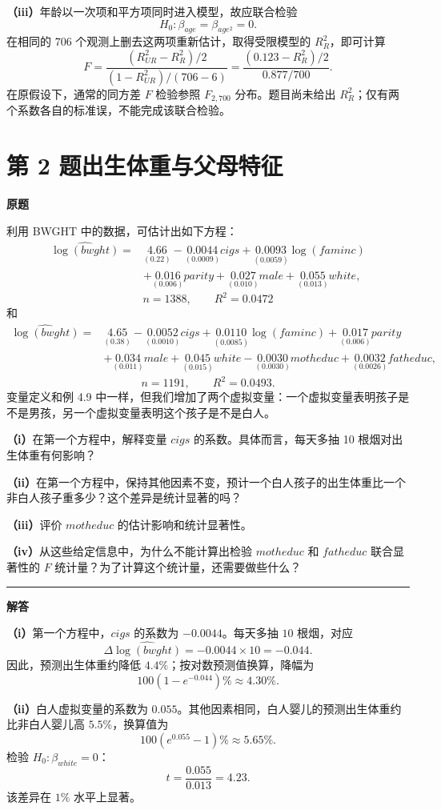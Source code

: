 \documentclass[UTF8,a4paper,11pt,fontset=fandol]{ctexart}
\newcommand{\vr}[1]{\mathit{#1}}
\newcommand{\subq}[1]{\par\medskip\noindent\textbf{（#1）}\enspace}
\newcommand{\question}[2]{\def\currentquestiontitle{第 #1 题\quad #2}}
\newcommand{\coef}[2]{\underset{\scriptstyle(#2)}{#1}}
\newenvironment{originalquestion}{%
  \par\medskip\noindent\begin{minipage}{\linewidth}
  \section*{\currentquestiontitle}
  \par\smallskip\noindent\textbf{原题}\par\smallskip
  \begingroup\small\setlength{\parskip}{2.5pt}%
}{%
  \par\endgroup\end{minipage}\par\medskip\Needspace{6\baselineskip}
  \noindent\rule{\linewidth}{0.35pt}\par\smallskip
  \noindent\textbf{解答}\par
}
\begin{document}
\subq{iii}年龄以一次项和平方项同时进入模型，故应联合检验
\[
H_0:\beta_{\vr{age}}=\beta_{\vr{age}^2}=0.
\]
在相同的 $706$ 个观测上删去这两项重新估计，取得受限模型的 $R_R^2$，即可计算
\[
F=\frac{(R_{UR}^2-R_R^2)/2}{(1-R_{UR}^2)/(706-6)}
 =\frac{(0.123-R_R^2)/2}{0.877/700}.
\]
在原假设下，通常的同方差 $F$ 检验参照 $F_{2,700}$ 分布。题目尚未给出 $R_R^2$；仅有两个系数各自的标准误，不能完成该联合检验。

\question{2}{出生体重与父母特征}
\begin{originalquestion}
利用 BWGHT 中的数据，可估计出如下方程：
\[
\begin{aligned}
\widehat{\log(\vr{bwght})}={}&\coef{4.66}{0.22}
-\coef{0.0044}{0.0009}\vr{cigs}
+\coef{0.0093}{0.0059}\log(\vr{faminc})\\
&+\coef{0.016}{0.006}\vr{parity}
+\coef{0.027}{0.010}\vr{male}
+\coef{0.055}{0.013}\vr{white},
\end{aligned}
\]
\[
n=1388,\qquad R^2=0.0472
\]
和
\[
\begin{aligned}
\widehat{\log(\vr{bwght})}={}&\coef{4.65}{0.38}
-\coef{0.0052}{0.0010}\vr{cigs}
+\coef{0.0110}{0.0085}\log(\vr{faminc})
+\coef{0.017}{0.006}\vr{parity}\\
&+\coef{0.034}{0.011}\vr{male}
+\coef{0.045}{0.015}\vr{white}
-\coef{0.0030}{0.0030}\vr{motheduc}
+\coef{0.0032}{0.0026}\vr{fatheduc},
\end{aligned}
\]
\[
n=1191,\qquad R^2=0.0493.
\]
变量定义和例 4.9 中一样，但我们增加了两个虚拟变量：一个虚拟变量表明孩子是不是男孩，另一个虚拟变量表明这个孩子是不是白人。

\subq{i}在第一个方程中，解释变量 $\vr{cigs}$ 的系数。具体而言，每天多抽 10 根烟对出生体重有何影响？

\subq{ii}在第一个方程中，保持其他因素不变，预计一个白人孩子的出生体重比一个非白人孩子重多少？这个差异是统计显著的吗？

\subq{iii}评价 $\vr{motheduc}$ 的估计影响和统计显著性。

\subq{iv}从这些给定信息中，为什么不能计算出检验 $\vr{motheduc}$ 和 $\vr{fatheduc}$ 联合显著性的 $F$ 统计量？为了计算这个统计量，还需要做些什么？
\end{originalquestion}

\subq{i}第一个方程中，$\vr{cigs}$ 的系数为 $-0.0044$。每天多抽 $10$ 根烟，对应
\[
\Delta\widehat{\log(\vr{bwght})}=-0.0044\times10=-0.044.
\]
因此，预测出生体重约降低 $4.4\%$；按对数预测值换算，降幅为
\[
100(1-e^{-0.044})\%\approx4.30\%.
\]

\subq{ii}白人虚拟变量的系数为 $0.055$。其他因素相同，白人婴儿的预测出生体重约比非白人婴儿高 $5.5\%$，换算值为
\[
100(e^{0.055}-1)\%\approx5.65\%.
\]
检验 $H_0:\beta_{\vr{white}}=0$：
\[
t=\frac{0.055}{0.013}=4.23.
\]
该差异在 $1\%$ 水平上显著。
\end{document}
